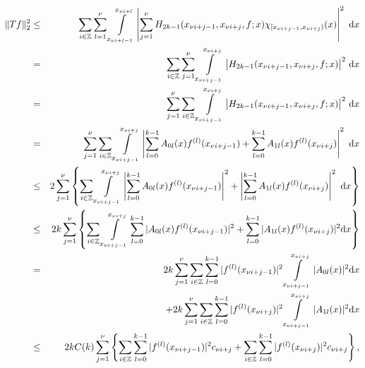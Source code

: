 \documentclass[a4paper,12pt,reqno]{amsart}
\theoremstyle{plain}
\numberwithin{equation}{section}
\theoremstyle{definition}
\newcommand{\ds}{\displaystyle}
\begin{document}
\begin{eqnarray}\label{pap7eqn3.9}
\|T f\|_2^2
&\leq&\ds\sum\limits_{i\in\mathbb{Z}}\sum\limits_{l=1}^\nu\int\limits_{x_{\nu i+l-1}}^{x_{\nu i+l}}\left|\sum\limits_{j=1}^{\nu}H_{2k-1}(x_{\nu i+j-1},x_{\nu i+j},f;x)\chi_{[x_{\nu i+j-1},x_{\nu i+j})}(x)\right|^2~\mathrm{d}x\nonumber\\
&=&\ds\sum\limits_{i\in\mathbb{Z}}\sum\limits_{j=1}^{\nu}\int\limits_{x_{\nu i+j-1}}^{x_{\nu i+j}}\big|H_{2k-1}(x_{\nu i+j-1},x_{\nu i+j},f;x)\big|^2~\mathrm{d}x\nonumber\\
&=&\ds\sum\limits_{j=1}^{\nu}\sum\limits_{i\in\mathbb{Z}}\int\limits_{x_{\nu i+j-1}}^{x_{\nu i+j}}\big|H_{2k-1}(x_{\nu i+j-1},x_{\nu i+j},f;x)\big|^2~\mathrm{d}x\nonumber\\
&=&\ds\sum\limits_{j=1}^{\nu}\ds\sum\limits_{i\in\mathbb{Z}}\int\limits_{x_{\nu i+j-1}}^{x_{\nu i+j}}
\left|\ds\sum\limits_{l=0}^{k-1}A_{0l}(x)f^{(l)}(x_{\nu i+j-1})+\ds\sum\limits_{l=0}^{k-1}A_{1l}(x)f^{(l)}(x_{\nu i+j})\right|^2~\mathrm{d}x\nonumber\\
&\leq&2\ds\sum\limits_{j=1}^{\nu}\left\{\ds\sum\limits_{i\in\mathbb{Z}}\int\limits_{x_{\nu i+j-1}}^{x_{\nu i+j}}
\left|\ds\sum\limits_{l=0}^{k-1}A_{0l}(x)f^{(l)}(x_{\nu i+j-1})\right|^2+\left|\ds\sum\limits_{l=0}^{k-1}A_{1l}(x)f^{(l)}(x_{\nu i+j})\right|^2~\mathrm{d}x\right\}\nonumber\\
&\leq&2k\sum\limits_{j=1}^{\nu}\left\{\ds\sum\limits_{i\in\mathbb{Z}}\int\limits_{x_{\nu i+j-1}}^{x_{\nu i+j}}
\ds\sum\limits_{l=0}^{k-1}|A_{0l}(x)f^{(l)}(x_{\nu i+j-1})|^2+\ds\sum\limits_{l=0}^{k-1}|A_{1l}(x)f^{(l)}(x_{\nu i+j})|^2\mathrm{d}x\right\}\nonumber\\
&=&2k\sum\limits_{j=1}^{\nu}\ds\sum\limits_{i\in\mathbb{Z}}
\ds\sum\limits_{l=0}^{k-1}|f^{(l)}(x_{\nu i+j-1})|^2\int\limits_{x_{\nu i+j-1}}^{x_{\nu i+j}}|A_{0l}(x)|^2\mathrm{d}x\nonumber\\
&&\hspace*{3cm}+2k\sum\limits_{j=1}^{\nu}\ds\sum\limits_{i\in\mathbb{Z}}\ds\sum\limits_{l=0}^{k-1}|f^{(l)}(x_{\nu i+j})|^2\int\limits_{x_{\nu i+j-1}}^{x_{\nu i+j}}|A_{1l}(x)|^2\mathrm{d}x\nonumber\\
&\leq&2kC(k)\sum\limits_{j=1}^{\nu}\left\{\ds\sum\limits_{i\in\mathbb{Z}}
\ds\sum\limits_{l=0}^{k-1}|f^{(l)}(x_{\nu i+j-1})|^2 c_{\nu i+j}
+\ds\sum\limits_{i\in\mathbb{Z}}\ds\sum\limits_{l=0}^{k-1}|f^{(l)}(x_{\nu i+j})|^2 c_{\nu i+j}\right\},\nonumber\\
\end{eqnarray}
\end{document}
